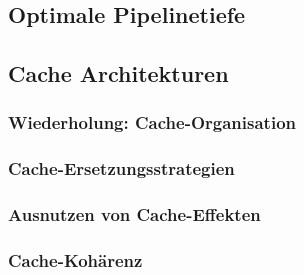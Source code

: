 \subsection{Optimale Pipelinetiefe}
\subsection{Cache Architekturen}
\subsubsection{Wiederholung: Cache-Organisation}
\subsubsection{Cache-Ersetzungsstrategien}
\subsubsection{Ausnutzen von Cache-Effekten}
\subsubsection{Cache-Kohärenz}
